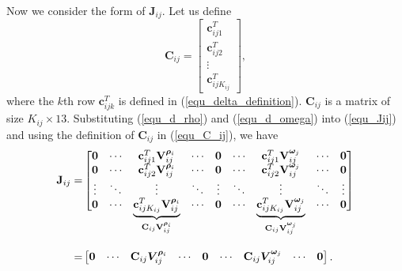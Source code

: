 \documentclass{vgtc}                          %
\begin{document}
Now we consider the form of $\mathbf{J}_{ij}$. Let us define
\begin{equation} \label{equ_C_ij}
\mathbf{C}_{ij} =  \begin{bmatrix}
\mathbf{c}_{ij1}^{T} \\
\mathbf{c}_{ij2}^{T} \\
\vdots \\
\mathbf{c}_{ijK_{ij}}^{T}
\end{bmatrix},
\end{equation}
where  the $k$th row $\mathbf{c}_{ijk}^{T} $ is defined in (\ref{equ_delta_definition}).  $\mathbf{C}_{ij}$ is a matrix of size $K_{ij} \times 13$. Substituting (\ref{equ_d_rho}) and (\ref{equ_d_omega}) into (\ref{equ_Jij}) and using the definition of $\mathbf{C}_{ij}$ in (\ref{equ_C_ij}), we have
\begin{equation} \label{equ_Jij_block}
	\begin{split}
		\mathbf{J}_{ij} = & \begin{bmatrix}
			\mathbf{0} & \cdots & \mathbf{c}_{ij1}^{T}\mathbf{V}^{\bm{\rho}_{i}}_{ij} & \cdots  & \mathbf{0} & \cdots &   \mathbf{c}_{ij1}^{T}\mathbf{V}^{\bm{\omega}_{j}}_{ij}& \cdots & \mathbf{0} \\
			\mathbf{0} & \cdots & \mathbf{c}_{ij2}^{T}\mathbf{V}^{\bm{\rho}_{i}}_{ij} & \cdots  & \mathbf{0} & \cdots &   \mathbf{c}_{ij2}^{T}\mathbf{V}^{\bm{\omega}_{j}}_{ij} & \cdots & \mathbf{0} \\
			\vdots & \ddots & 	\vdots & \ddots & \vdots & \ddots& \vdots & \ddots &\vdots\\
			\mathbf{0} & \cdots &  
			\smash{\underbrace{\mathbf{c}_{ijK_{ij}}^{T}\mathbf{V}^{\bm{\rho}_{i}}_{ij} }_{\mathbf{C}_{ij}\mathbf{V}^{\bm{\rho}_{i}}_{ij} } }& \cdots   & \mathbf{0} & 
			\cdots & \smash{\underbrace{\mathbf{c}_{ijK_{ij}}^{T}\mathbf{V}^{\bm{\omega}_{j}}_{ij} }_{\mathbf{C}_{ij}\mathbf{V}^{\bm{\omega}_{j}}_{ij} }}& \cdots & \mathbf{0} \\
		\end{bmatrix}\\	
		\\
		\\
		=&\begin{bmatrix}
			\mathbf{0} & \cdots & \mathbf{C}_{ij}\bm{V}^{{\bm{\rho}}_{i}}_{ij} &  \cdots  & \mathbf{0} & \cdots & \mathbf{C}_{ij}\bm{V}^{{\bm{\omega}}_{j}}_{ij} & \cdots  & \mathbf{0}
		\end{bmatrix}.
	\end{split}
\end{equation}
\end{document}
